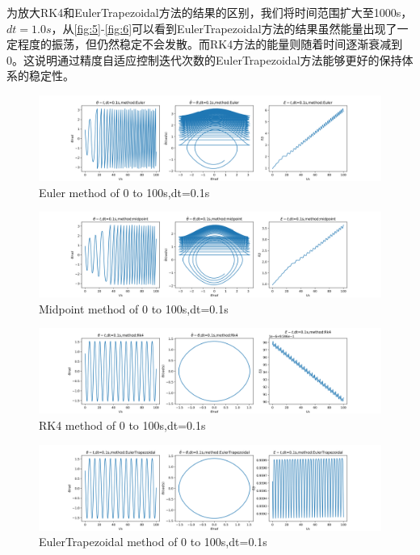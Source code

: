 \documentclass[11pt]{article}
\begin{document}
  为放大RK4和EulerTrapezoidal方法的结果的区别，我们将时间范围扩大至1000s，$dt=1.0s$，从\ref{fig:5}-\ref{fig:6}可以看到EulerTrapezoidal方法的结果虽然能量出现了一定程度的振荡，但仍然稳定不会发散。而RK4方法的能量则随着时间逐渐衰减到0。这说明通过精度自适应控制迭代次数的EulerTrapezoidal方法能够更好的保持体系的稳定性。
  \begin{figure}[ht]
    \centering
    \includegraphics[width=1.0\linewidth]{photo/pendulum_dt=0.1_method=Euler.png}
    \caption{Euler method of 0 to 100s,dt=0.1s}
    \label{fig:1}
  \end{figure}

  \begin{figure}[ht]
    \centering
    \includegraphics[width=1.0\linewidth]{photo/pendulum_dt=0.1_method=Midpoint.png}
    \caption{Midpoint method of 0 to 100s,dt=0.1s}
    \label{fig:2}
  \end{figure}

  \begin{figure}
    \centering
    \includegraphics[width=1.0\linewidth]{photo/pendulum_dt=0.1_method=Rk4.png}
    \caption{RK4 method of 0 to 100s,dt=0.1s}
    \label{fig:3}
  \end{figure}

  \begin{figure}
    \centering
    \includegraphics[width=1.0\linewidth]{photo/pendulum_dt=0.1_method=EulerTrapezoidal.png}
    \caption{EulerTrapezoidal method of 0 to 100s,dt=0.1s}
    \label{fig:4}
  \end{figure}
\end{document}
